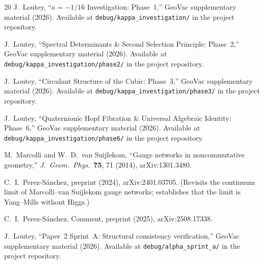 \documentclass[aps,prl,twocolumn,superscriptaddress]{revtex4-2}
\begin{document}
\begin{thebibliography}{20}
J.~Loutey, ``$\kappa = -1/16$ Investigation: Phase~1,'' GeoVac
supplementary material (2026). Available at
\texttt{debug/kappa\_investigation/} in the project repository.

J.~Loutey, ``Spectral Determinants \& Second Selection Principle:
Phase~2,'' GeoVac supplementary material (2026). Available at
\texttt{debug/kappa\_investigation/phase2/} in the project repository.

J.~Loutey, ``Circulant Structure of the Cubic: Phase~3,'' GeoVac
supplementary material (2026). Available at
\texttt{debug/kappa\_investigation/phase3/} in the project repository.

J.~Loutey, ``Quaternionic Hopf Fibration \& Universal Algebraic
Identity: Phase~6,'' GeoVac supplementary material (2026). Available
at \texttt{debug/kappa\_investigation/phase6/} in the project
repository.

M.~Marcolli and W.~D.~van Suijlekom, ``Gauge networks in noncommutative
geometry,'' \textit{J.\ Geom.\ Phys.}\ \textbf{75}, 71 (2014),
arXiv:1301.3480.

C.~I.~Perez-S\'anchez, preprint (2024), arXiv:2401.03705. (Revisits
the continuum limit of Marcolli--van Suijlekom gauge networks;
establishes that the limit is Yang--Mills without Higgs.)

C.~I.~Perez-S\'anchez, Comment, preprint (2025), arXiv:2508.17338.

J.~Loutey, ``Paper~2 Sprint~A: Structural consistency verification,''
GeoVac supplementary material (2026). Available at
\texttt{debug/alpha\_sprint\_a/} in the project repository.

\end{thebibliography}
\end{document}
